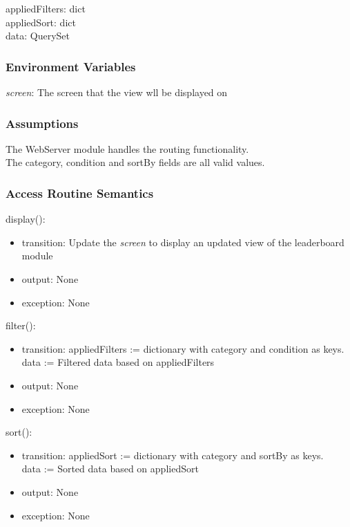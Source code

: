 \documentclass[12pt, titlepage]{article}
\begin{document}
appliedFilters: dict \\
appliedSort: dict \\
data: QuerySet

\subsubsection{Environment Variables}

\textit{screen}: The screen that the view wll be displayed on

\subsubsection{Assumptions}

The WebServer module handles the routing functionality. \\
The category, condition and sortBy fields are all valid values.

\subsubsection{Access Routine Semantics}

\noindent display():
\begin{itemize}
\item transition: Update the \textit{screen} to display an updated view of the leaderboard module
\item output: None
\item exception: None
\end{itemize}

\noindent filter():
\begin{itemize}
\item transition: appliedFilters := dictionary with category and condition as keys. \\
data := Filtered data based on appliedFilters
\item output: None
\item exception: None
\end{itemize}

\noindent sort():
\begin{itemize}
\item transition: appliedSort := dictionary with category and sortBy as keys. \\
data := Sorted data based on appliedSort
\item output: None
\item exception: None
\end{itemize}
\end{document}
